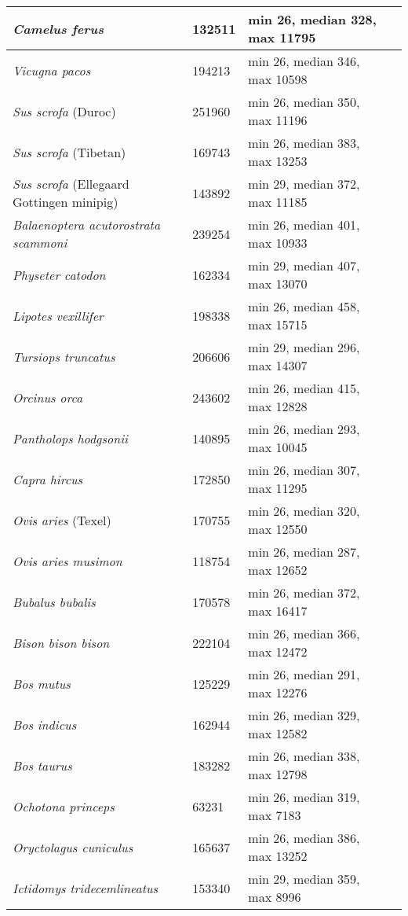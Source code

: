 {\begin{longtable}{| L{4cm} | L{2cm}  | L{5cm} | L{4cm} |}
\textit{Camelus ferus} & 132511 & min 26, median 328, max 11795 & \\ \hline
\textit{Vicugna pacos} & 194213 & min 26, median 346, max 10598 & \\ \hline
\textit{Sus scrofa} (Duroc) & 251960 & min 26, median 350, max 11196 & \\ \hline
\textit{Sus scrofa} (Tibetan) & 169743 & min 26, median 383, max 13253 & \\ \hline
\textit{Sus scrofa} (Ellegaard Gottingen minipig) & 143892 & min 29, median 372, max 11185 & \\ \hline
\textit{Balaenoptera acutorostrata scammoni} & 239254 & min 26, median 401, max 10933 & \\ \hline
\textit{Physeter catodon} & 162334 & min 29, median 407, max 13070 & \\ \hline
\textit{Lipotes vexillifer} & 198338 & min 26, median 458, max 15715 & \\ \hline
\textit{Tursiops truncatus} & 206606 & min 29, median 296, max 14307 & \\ \hline
\textit{Orcinus orca} & 243602 & min 26, median 415, max 12828 & \\ \hline
\textit{Pantholops hodgsonii} & 140895 & min 26, median 293, max 10045 & \\ \hline
\textit{Capra hircus} & 172850 & min 26, median 307, max 11295 & \\ \hline
\textit{Ovis aries} (Texel) & 170755 & min 26, median 320, max 12550 & \\ \hline
\textit{Ovis aries musimon} & 118754 & min 26, median 287, max 12652 & \\ \hline
\textit{Bubalus bubalis} & 170578 & min 26, median 372, max 16417 & \\ \hline
\textit{Bison bison bison} & 222104 & min 26, median 366, max 12472 & \\ \hline
\textit{Bos mutus} & 125229 & min 26, median 291, max 12276 & \\ \hline
\textit{Bos indicus} & 162944 & min 26, median 329, max 12582 & \\ \hline
\textit{Bos taurus} & 183282 & min 26, median 338, max 12798 & \\ \hline
\textit{Ochotona princeps} & 63231 & min 26, median 319, max 7183 & \\ \hline
\textit{Oryctolagus cuniculus} & 165637 & min 26, median 386, max 13252 & \\ \hline
\textit{Ictidomys tridecemlineatus} & 153340 & min 29, median 359, max 8996 & \\ \hline

\end{longtable}}
